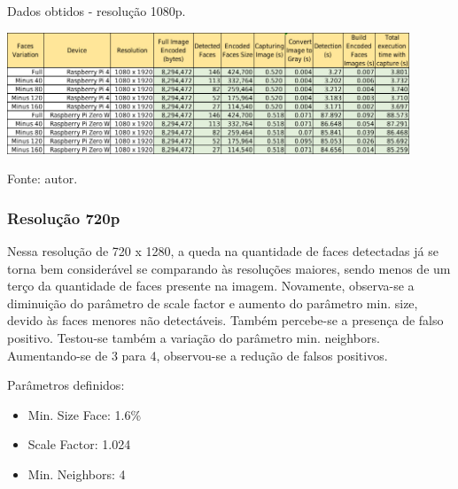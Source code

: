 \begin{table}
    \centering
    \caption[Dados obtidos - resolução 1080p.]{Dados obtidos - resolução 1080p.}
    \includegraphics[width=0.90\textwidth]{Cap4_Experimentos_Realizados/Figures/cena1_dados_1080p.jpg}
    \caption*{Fonte: autor.}
    \label{fig:dadosCena1_1080p}
\end{table}

\subsubsection{Resolução 720p} \label{sssec:resolution1-3}

Nessa resolução de 720 x 1280, a queda na quantidade de faces detectadas já se torna bem considerável se comparando às resoluções maiores, sendo menos de um terço da quantidade de faces presente na imagem. Novamente, observa-se a diminuição do parâmetro de scale factor e aumento do parâmetro min. size, devido às faces menores não detectáveis.
Também percebe-se a presença de falso positivo. Testou-se também a variação do parâmetro min. neighbors. Aumentando-se de 3 para 4, observou-se a redução de falsos positivos.

Parâmetros definidos: 
\begin{itemize}
    \SingleSpacing
    \item Min. Size Face: 1.6\%
    \item Scale Factor: 1.024
    \item Min. Neighbors: 4
\end{itemize}

